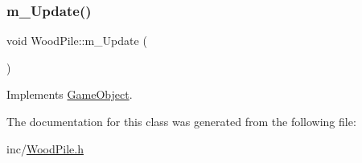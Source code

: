 \mbox{\label{class_wood_pile_a008e8dc7b168ab4e0bcc946c240d0a32}} 
\subsubsection{\texorpdfstring{m\+\_\+\+Update()}{m\_Update()}}
{\footnotesize\ttfamily void Wood\+Pile\+::m\+\_\+\+Update (\begin{DoxyParamCaption}{ }\end{DoxyParamCaption})\hspace{0.3cm}{\ttfamily [virtual]}}



Implements \mbox{\hyperlink{class_game_object_a3af5a7b470e09f13a1422439fc6a9ba8}{Game\+Object}}.



The documentation for this class was generated from the following file\+:\begin{DoxyCompactItemize}
\item 
inc/\mbox{\hyperlink{_wood_pile_8h}{Wood\+Pile.\+h}}\end{DoxyCompactItemize}
